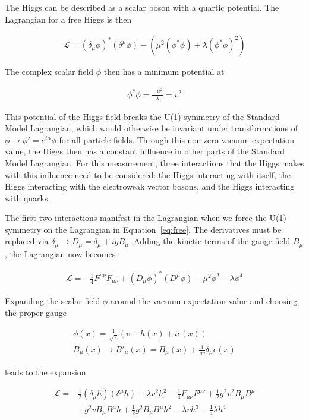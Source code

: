 The Higgs can be described as a scalar boson with a quartic potential.
The Lagrangian for a free Higgs is then

\begin{gather}
  \mathcal{L} = (\delta_\mu \phi)^* (\delta^\mu \phi) - (\mu^2(\phi^*\phi) + \lambda(\phi^*\phi)^2) \label{eq:free}
\end{gather}

The complex scalar field $\phi$ then has a minimum potential at

\begin{gather}
  \phi^*\phi = \frac{-\mu^2}{\lambda} = v^2 \label{eq:vacuum}
\end{gather}

This potential of the Higgs field breaks the U(1) symmetry of the Standard Model Lagrangian,
which would otherwise be invariant under transformations of
$\phi \rightarrow \phi' = e^{i\alpha}\phi$ for all particle fields.
Through this non-zero vacuum expectation value, the Higgs then has a constant influence
in other parts of the Standard Model Lagrangian.
For this measurement, three interactions that the Higgs makes
with this influence need to be considered:
the Higgs interacting with itself,
the Higgs interacting with the electroweak vector bosons,
and the Higgs interacting with quarks.

The first two interactions manifest in the Lagrangian when
we force the U(1) symmetry on the Lagrangian in Equation~\ref{eq:free}.
The derivatives must be replaced via $\delta_\mu \rightarrow D_\mu = \delta_\mu + igB_\mu$.
Adding the kinetic terms of the gauge field $B_\mu$, the Lagrangian now becomes

\begin{gather}
  \mathcal{L} = -\frac14 F^{\mu\nu} F_{\mu\nu} + (D_\mu \phi)^* (D^\mu \phi) - \mu^2 \phi^2 - \lambda \phi^4
\end{gather}

Expanding the scalar field $\phi$ around the vacuum expectation value and choosing the proper gauge

\begin{gather}
  \phi(x) = \frac1{\sqrt{2}} (v + h(x) + i\epsilon(x)) \\
  B_\mu(x) \rightarrow B'_\mu(x) = B_\mu(x) + \frac1{gv}\delta_\mu\epsilon(x)
\end{gather}

leads to the expansion

\begin{align}
  \mathcal{L} = & \frac12(\delta_\mu h)(\delta^\mu h) - \lambda v^2 h^2 - \frac14 F_{\mu\nu} F^{\mu\nu} + \frac12 g^2 v^2 B_\mu B^\mu \nonumber \\
                & + g^2 v B_\mu B^\mu h + \frac12 g^2 B_\mu B^\mu h^2 - \lambda v h^3 - \frac14 \lambda h^4
\end{align}


